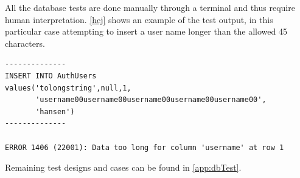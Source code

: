 All the database tests are done manually through a terminal and thus require human interpretation. \autoref{hej} shows an example of the test output, in this particular case attempting
to insert a user name longer than the allowed 45 characters. 


\begin{Code}
\begin{lstlisting}[label=hej,caption=Test case output]
--------------
INSERT INTO AuthUsers
values('tolongstring',null,1,
       'username00username00username00username00username00',
       'hansen')
--------------

ERROR 1406 (22001): Data too long for column 'username' at row 1
\end{lstlisting}
\end{Code}

Remaining test designs and cases can be found in \ref{app:dbTest}.







